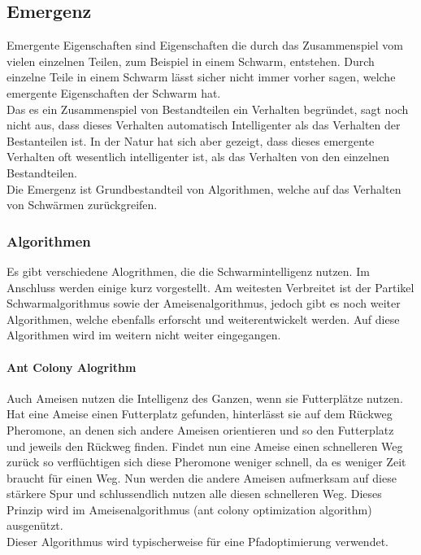		\subsection{Emergenz}
		Emergente Eigenschaften sind Eigenschaften die durch das Zusammenspiel vom vielen einzelnen Teilen, zum Beispiel in einem Schwarm, entstehen. Durch einzelne Teile in einem Schwarm lässt sicher nicht immer vorher sagen, welche emergente Eigenschaften der Schwarm hat. \\
		Das es ein Zusammenspiel von Bestandteilen ein Verhalten begründet, sagt noch nicht aus, dass dieses Verhalten automatisch Intelligenter als das Verhalten der Bestanteilen ist. In der Natur hat sich aber gezeigt, dass dieses emergente Verhalten oft wesentlich intelligenter ist, als das Verhalten von den einzelnen Bestandteilen. \\
		Die Emergenz ist Grundbestandteil von Algorithmen, welche auf das Verhalten von Schwärmen zurückgreifen.
		
		
				
		\subsubsection{Algorithmen}
		Es gibt verschiedene Alogrithmen, die die Schwarmintelligenz nutzen. Im Anschluss werden einige kurz vorgestellt. Am weitesten Verbreitet ist der Partikel Schwarmalgorithmus sowie der Ameisenalgorithmus, jedoch gibt es noch weiter Algorithmen, welche ebenfalls erforscht und weiterentwickelt werden. Auf diese Algorithmen wird im weitern nicht weiter eingegangen.
		
		\paragraph{Ant Colony Alogrithm}
		$\;$ \\
		Auch Ameisen nutzen die Intelligenz des Ganzen, wenn sie Futterplätze nutzen. Hat eine Ameise einen Futterplatz gefunden, hinterlässt sie auf dem Rückweg Pheromone, an denen sich andere Ameisen orientieren und so den Futterplatz und jeweils den Rückweg finden. Findet nun eine Ameise einen schnelleren Weg zurück so verflüchtigen sich diese Pheromone weniger schnell, da es weniger Zeit braucht für einen Weg. Nun werden die andere Ameisen aufmerksam auf diese stärkere Spur und schlussendlich nutzen alle diesen schnelleren Weg. Dieses Prinzip wird im Ameisenalgorithmus (ant colony optimization algorithm) ausgenützt.\\Dieser Algorithmus wird typischerweise für eine Pfadoptimierung verwendet.
		
